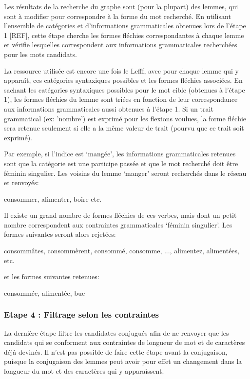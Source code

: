 Les résultats de la recherche du graphe sont (pour la plupart) des lemmes, qui sont à modifier pour correspondre à la forme du mot recherché. En utilisant l'ensemble de catégories et d'informations grammaticales obtenues lors de l'étape 1 [REF], cette étape cherche les formes fléchies correspondantes à chaque lemme et vérifie lesquelles correspondent aux informations grammaticales recherchées pour les mots candidats.

La ressource utilisée est encore une fois le Lefff, avec pour chaque lemme qui y apparaît, ces catégories syntaxiques possibles et les formes fléchies associées. En sachant les catégories syntaxiques possibles pour le mot cible (obtenues à l'étape 1), les formes fléchies du lemme sont triées en fonction de leur correspondance aux informations grammaticales aussi obtenues à l'étape 1. Si un trait grammatical (ex: 'nombre') est exprimé pour les flexions voulues, la forme fléchie sera retenue seulement si elle a la même valeur de trait (pourvu que ce trait soit exprimé).

Par exemple, si l'indice est \lq{mangée}\rq{}, les informations grammaticales retenues sont que la catégorie est une participe passée et que le mot recherché doit être féminin singulier. Les voisins du lemme \lq{manger}\rq{} seront recherchés dans le réseau et renvoyés:

\begin{framed}
consommer, alimenter, boire etc.
\end{framed}

Il existe un grand nombre de formes fléchies de ces verbes, mais dont un petit nombre correspondent aux contraintes grammaticales \lq{féminin singulier}\rq{}. Les formes suivantes seront alors rejetées:

\begin{framed}
consommâtes, consommèrent, consommé, consomme, ..., alimentez, alimentées, etc.
\end{framed}

et les formes suivantes retenues:

\begin{framed}
consommée, alimentée, bue
\end{framed}

\subsubsection{Etape 4 : Filtrage selon les contraintes}

La dernière étape filtre les candidates conjugués afin de ne renvoyer que les candidats qui se conforment aux contraintes de longueur de mot et de caractères déjà devinés. Il n'est pas possible de faire cette étape avant la conjugaison, puisque la conjugaison des lemmes peut avoir pour effet un changement dans la longueur du mot et des caractères qui y apparaîssent.

